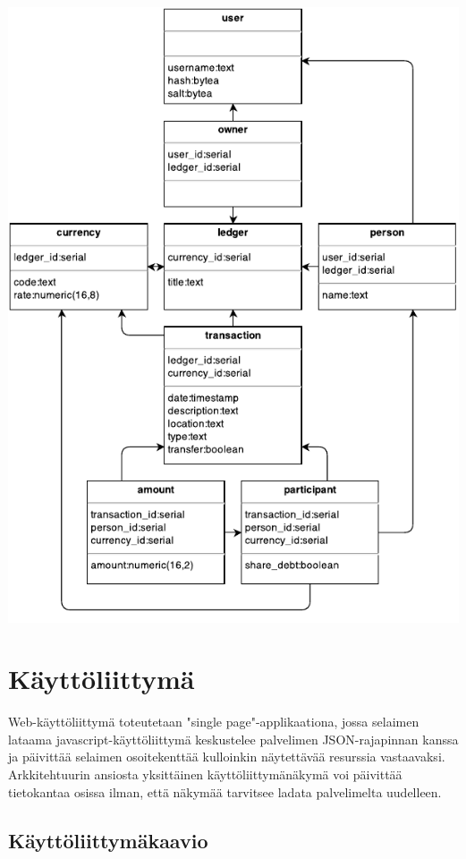 \documentclass[a4paper]{scrartcl}
\begin{document}
\includegraphics[scale=1.35]{schema}

\section{Käyttöliittymä}

Web-käyttöliittymä toteutetaan "single page"-applikaationa, jossa selaimen
lataama javascript-käyttöliittymä keskustelee palvelimen JSON-rajapinnan
kanssa ja päivittää selaimen osoitekenttää kulloinkin näytettävää resurssia
vastaavaksi. Arkkitehtuurin ansiosta yksittäinen käyttöliittymänäkymä voi
päivittää tietokantaa osissa ilman, että näkymää tarvitsee ladata palvelimelta
uudelleen.

\subsection{Käyttöliittymäkaavio}
\end{document}
